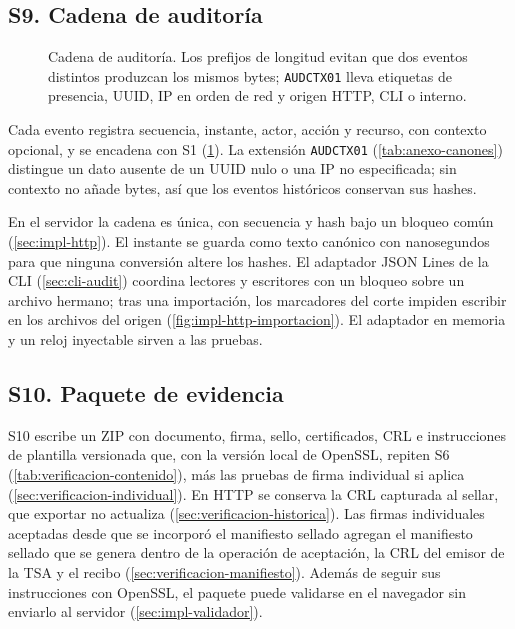 \subsection{S9. Cadena de auditoría}\label{sec:impl-s9-auditoria}

\begin{figure}[!b]
  \centering
  
  \caption{Cadena de auditoría. Los prefijos de longitud evitan que dos eventos distintos produzcan los mismos bytes; \texttt{AUDCTX01} lleva etiquetas de presencia, UUID, IP en orden de red y origen HTTP, CLI o interno.}
  \label{fig:impl-auditoria}
\end{figure}

Cada evento registra secuencia, instante, actor, acción y recurso, con contexto opcional, y se encadena con S1 (\cref{fig:impl-auditoria}). La extensión \texttt{AUDCTX01} (\cref{tab:anexo-canones}) distingue un dato ausente de un UUID nulo o una IP no especificada; sin contexto no añade bytes, así que los eventos históricos conservan sus hashes.

En el servidor la cadena es única, con secuencia y hash bajo un bloqueo común (\cref{sec:impl-http}). El instante se guarda como texto canónico con nanosegundos para que ninguna conversión altere los hashes. El adaptador JSON Lines de la CLI (\cref{sec:cli-audit}) coordina lectores y escritores con un bloqueo sobre un archivo hermano; tras una importación, los marcadores del corte impiden escribir en los archivos del origen (\cref{fig:impl-http-importacion}). El adaptador en memoria y un reloj inyectable sirven a las pruebas.

\subsection{S10. Paquete de evidencia}\label{sec:impl-s10-evidencia}

S10 escribe un ZIP con documento, firma, sello, certificados, CRL e instrucciones de plantilla versionada que, con la versión local de OpenSSL, repiten S6 (\cref{tab:verificacion-contenido}), más las pruebas de firma individual si aplica (\cref{sec:verificacion-individual}). En HTTP se conserva la CRL capturada al sellar, que exportar no actualiza (\cref{sec:verificacion-historica}). Las firmas individuales aceptadas desde que se incorporó el manifiesto sellado agregan el manifiesto sellado que se genera dentro de la operación de aceptación, la CRL del emisor de la TSA y el recibo (\cref{sec:verificacion-manifiesto}). Además de seguir sus instrucciones con OpenSSL, el paquete puede validarse en el navegador sin enviarlo al servidor (\cref{sec:impl-validador}).

